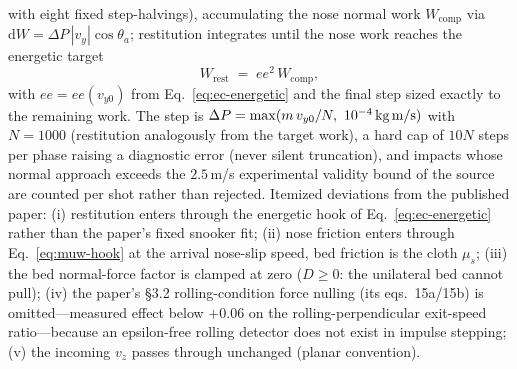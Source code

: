 with eight fixed step-halvings), accumulating the nose normal work
$W_{\mathrm{comp}}$ via $\mathrm{d}W = \Delta P\,|v_y|\cos\theta_a$;
restitution integrates until the nose work reaches the energetic
target
\begin{equation}
W_{\mathrm{rest}} \;=\; ee^{2}\,W_{\mathrm{comp}},
\label{eq:mathavan-ee}
\end{equation}
with $ee = ee(v_{y0})$ from Eq.~\eqref{eq:ec-energetic} and the final
step sized exactly to the remaining work. The step is
$\Delta P = \max(m\,v_{y0}/N,\ 10^{-4}\,\text{kg\,m/s})$ with
$N = 1000$ (restitution analogously from the target work), a hard cap
of $10N$ steps per phase raising a diagnostic error (never silent
truncation), and impacts whose normal approach exceeds the
$2.5$\,m/s experimental validity bound of the source are counted per
shot rather than rejected. Itemized deviations from the published
paper: (i) restitution enters through the energetic hook of
Eq.~\eqref{eq:ec-energetic} rather than the paper's fixed snooker fit;
(ii) nose friction enters through Eq.~\eqref{eq:muw-hook} at the
arrival nose-slip speed, bed friction is the cloth $\mu_s$; (iii) the
bed normal-force factor is clamped at zero ($D \ge 0$: the unilateral
bed cannot pull); (iv) the paper's \S3.2 rolling-condition force
nulling (its eqs.~15a/15b) is omitted---measured effect below $+0.06$
on the rolling-perpendicular exit-speed ratio---because an
epsilon-free rolling detector does not exist in impulse stepping;
(v) the incoming $v_z$ passes through unchanged (planar convention).

